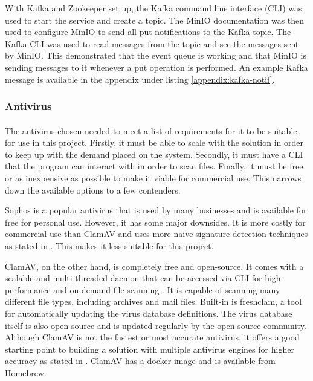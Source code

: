 \documentclass[12pt, conference, final, a4paper, onecolumn, compsoc]{IEEEtran}
\begin{document}
With Kafka and Zookeeper set up, the Kafka command line interface (CLI) was used
to start the service and create a topic. The MinIO documentation was then used
to configure MinIO to send all put notifications to the Kafka topic. The Kafka
CLI was used to read messages from the topic and see the messages sent by MinIO.
This demonstrated that the event queue is working and that MinIO is sending
messages to it whenever a put operation is performed. An example Kafka message
is available in the appendix under listing \ref{appendix:kafka-notif}.

\subsubsection*{Antivirus}
\paragraph{}

The antivirus chosen needed to meet a list of requirements for it to be suitable
for use in this project. Firstly, it must be able to scale with the solution in
order to keep up with the demand placed on the system. Secondly, it must have a
CLI that the program can interact with in order to scan files. Finally, it must
be free or as inexpensive as possible to make it viable for commercial use. This
narrows down the available options to a few contenders.

Sophos is a popular antivirus that is used by many businesses and is available
for free for personal use. However, it has some major downsides. It is more
costly for commercial use than ClamAV and uses more naive signature detection techniques as
stated in \citep{sophos}. This makes it less suitable for this project.

ClamAV, on the other hand, is completely free and open-source. It comes with a
scalable and multi-threaded daemon that can be accessed via CLI for
high-performance and on-demand file scanning \citep{clamav}. It is capable of
scanning many different file types, including archives and mail files. Built-in
is freshclam, a tool for automatically updating the virus database definitions.
The virus database itself is also open-source and is updated regularly by the
open source community. Although ClamAV is not the fastest or most accurate
antivirus, it offers a good starting point to building a solution with multiple
antivirus engines for higher accuracy as stated in \citep{av-comparison}. ClamAV
has a docker image and is available from Homebrew.
\end{document}
